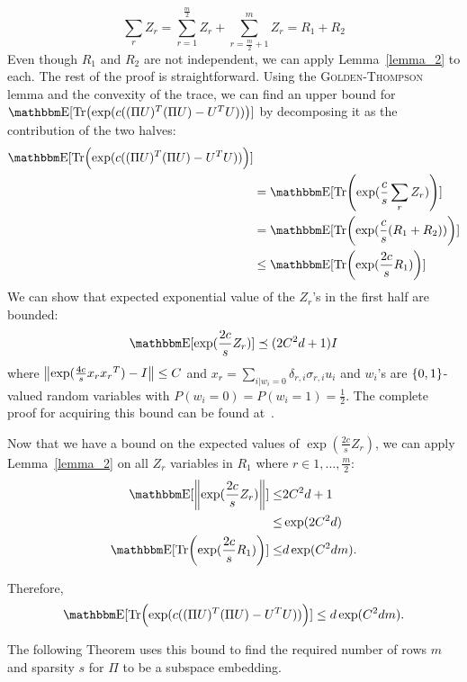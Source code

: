 \begin{equation}
    \sum_r Z_r = \sum_{r = 1}^{\frac{m}{2}} Z_r + \sum_{r = \frac{m}{2} + 1}^{m} Z_r = R_1 + R_2
\end{equation}
Even though $R_1$ and $R_2$ are not independent, we can apply Lemma~\ref{lemma_2} to each. The rest of the proof is straightforward. Using the \textsc{Golden-Thompson} lemma and the convexity of the trace, we can find an upper bound for $\av[\tr{\exp(c((\Pi U)^T (\Pi U) - U^TU))}]$ by decomposing it as the contribution of the two halves:
\begin{align*}
    \av[\tr{\exp(c((\Pi U)^T (\Pi U) - U^TU))}]  & \\ 
    &=  \av[\tr{\exp(\frac{c}{s}\sum_{r} Z_r)}] \\
    &= \av[\tr{\exp(\frac{c}{s}(R_1 + R_2))}]  \\ 
    & \leq \av[\tr{\exp(\frac{2c}{s}R_1)}]
\end{align*}
We can show that expected exponential value of the $Z_r$'s in the first half are bounded:
$$
    \av [\exp(\frac{2c}{s} Z_r)] \preceq (2 C^2 d + 1) I
$$
where $\norm{\exp(\frac{4c}{s} x_r {x_r}^{T}) - I } \leq C$ and $x_r = \sum_{i | w_i = 0} \delta_{r, i} \sigma_{r, i} u_i$ and $w_i$'s are $\{0,1\}$-valued random variables with $P(w_i = 0) = P(w_i = 1) = \frac{1}{2}$. The complete proof for acquiring this bound can be found at~\cite[p6]{cohen2016nearly}.

Now that we have a bound on the expected values of $\exp(\frac{2c}{s} Z_r)$, we can apply Lemma~\ref{lemma_2} on all $Z_r$ variables in $R_1$ where $r \in 1, \dots, \frac{m}{2}$:
\begin{align*}
    \av[\norm{\exp(\frac{2c}{s} Z_r)}] \leq & 2C^2d + 1 \\ \leq & \exp(2C^2 d) \\ 
    \av[\tr{\exp(\frac{2c}{s} R_1)}] \leq & d \exp(C^2dm).
\end{align*}

Therefore,
$$
\av[\tr{\exp(c((\Pi U)^T (\Pi U) - U^TU))}] \leq d \exp(C^2dm).
$$

The following Theorem uses this bound to find the required number of rows $m$ and sparsity $s$ for $\Pi$ to be a subspace embedding. 


